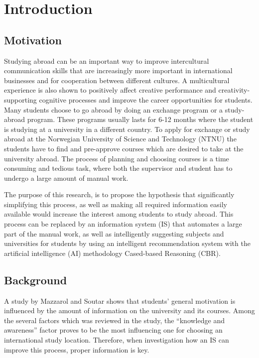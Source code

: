 
\chapter{Introduction}

\section{Motivation}

Studying abroad can be an important way to improve intercultural communication skills that are increasingly more important in international businesses and for cooperation between different cultures.\cite{williams2005exploring} A multicultural experience is also shown to positively affect creative performance and creativity-supporting
cognitive processes\cite{leung2008multicultural} and improve the career opportunities for students\cite{brandenburg2014erasmus}. Many students choose to go abroad by doing an exchange program or a study-abroad program. These programs usually lasts for 6-12 months where the student is studying at a university in a different country. To apply for exchange or study abroad at the Norwegian University of Science and Technology (NTNU) the students have to find and pre-approve courses which are desired to take at the university abroad. The process of planning and choosing courses is a time consuming and tedious task, where both the supervisor and student has to undergo a large amount of manual work.

The purpose of this research, is to propose the hypothesis that significantly simplifying this process, as well as making all required information easily available would increase the interest among students to study abroad. This process can be replaced by an information system (IS) that automates a large part of the manual work, as well as intelligently suggesting subjects and universities for students by using an intelligent recommendation system with the artificial intelligence (AI) methodology Cased-based Reasoning (CBR). 


\section{Background}

A study by Mazzarol and Soutar\cite{mazzarol2002push} shows that students' general motivation is influenced by the amount of information on the university and its courses. Among the several factors which was reviewed in the study, the \enquote{knowledge and awareness} factor proves to be the most influencing one for choosing an international study location. Therefore, when investigation how an IS can improve this process, proper information is key. 

